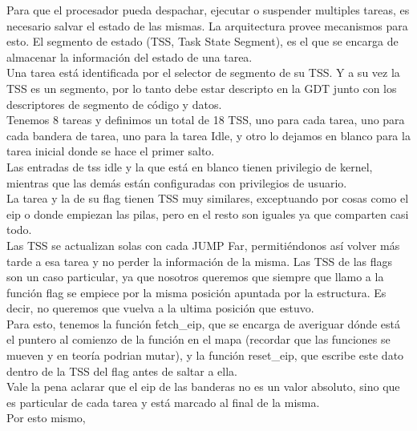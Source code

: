Para que el procesador pueda despachar, ejecutar o suspender multiples tareas, es necesario salvar el estado de las mismas. La arquitectura provee mecanismos para esto. El segmento de estado (TSS, Task State Segment), es el que se encarga de almacenar la informaci\'on del estado de una tarea.\\

Una tarea est\'a identificada por el selector de segmento de su TSS. Y a su vez la TSS es un segmento, por lo tanto debe estar descripto en la GDT junto con los descriptores de segmento de c\'odigo y datos.\\

Tenemos 8 tareas y definimos un total de 18 TSS, uno para cada tarea, uno para cada bandera de tarea, uno para la tarea Idle, y otro lo dejamos en blanco para la tarea inicial donde se hace el primer salto.\\
Las entradas de tss idle y la que est\'a en blanco tienen privilegio de kernel, mientras que las dem\'as est\'an configuradas con privilegios de usuario.\\

La tarea y la de su flag tienen TSS muy similares, exceptuando por cosas como el eip o donde empiezan las pilas, pero en el resto son iguales ya que comparten casi todo.\\


Las TSS se actualizan solas con cada JUMP Far, permiti\'endonos as\'i volver m\'as tarde a esa tarea y no perder la informaci\'on de la misma. Las TSS de las flags son un caso particular, ya que nosotros queremos que siempre que llamo a la funci\'on flag se empiece por la misma posici\'on apuntada por la estructura. Es decir, no queremos que vuelva a la ultima posici\'on que estuvo.\\

Para esto, tenemos la funci\'on fetch\_eip, que se encarga de averiguar d\'onde est\'a el puntero al comienzo de la funci\'on en el mapa (recordar que las funciones se mueven y en teor\'ia podrian mutar), y la funci\'on reset\_eip, que escribe este dato dentro de la TSS del flag antes de saltar a ella.\\

Vale la pena aclarar que el eip de las banderas no es un valor absoluto, sino que es particular de cada tarea y est\'a marcado al final de la misma.\\

Por esto mismo,  
